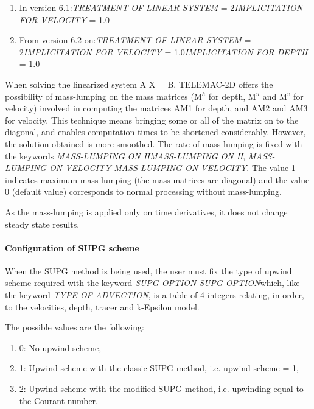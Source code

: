 \documentclass{article} %
\begin{document}
\begin{enumerate}
\item  In version 6.1:\textit{TREATMENT OF LINEAR SYSTEM} = 2\textit{IMPLICITATION FOR VELOCITY} = 1.0

\item  From version 6.2 on:\textit{TREATMENT OF LINEAR SYSTEM} = 2\textit{IMPLICITATION FOR VELOCITY} = 1.0\textit{IMPLICITATION FOR DEPTH} = 1.0
\end{enumerate}

 When solving the linearized system A X = B, TELEMAC-2D offers the possibility of mass-lumping on the mass matrices (M${}^{h}$ for depth, M${}^{u}$ and M${}^{v}$ for velocity) involved in computing the matrices AM1 for depth, and AM2 and AM3 for velocity. This technique means bringing some or all of the matrix on to the diagonal, and enables computation times to be shortened considerably. However, the solution obtained is more smoothed. The rate of mass-lumping is fixed with the keywords \textit{MASS-LUMPING ON HMASS-LUMPING ON H}, \textit{MASS-LUMPING ON VELOCITY MASS-LUMPING ON VELOCITY}. The value 1 indicates maximum mass-lumping (the mass matrices are diagonal) and the value 0 (default value) corresponds to normal processing without mass-lumping.

 As the mass-lumping is applied only on time derivatives, it does not change steady state results.


\paragraph{  Configuration of SUPG scheme}

 When the SUPG method is being used, the user must fix the type of upwind scheme required with the keyword \textit{SUPG OPTION} \textit{SUPG OPTION}which, like the keyword \textit{TYPE OF ADVECTION}, is a table of 4 integers relating, in order, to the velocities, depth, tracer and k-Epsilon model.

 The possible values are the following:

\begin{enumerate}
\item  0: No upwind scheme,

\item  1: Upwind scheme with the classic SUPG method, i.e. upwind scheme = 1,

\item  2: Upwind scheme with the modified SUPG method, i.e. upwinding equal to the Courant number.
\end{enumerate}
\end{document}
